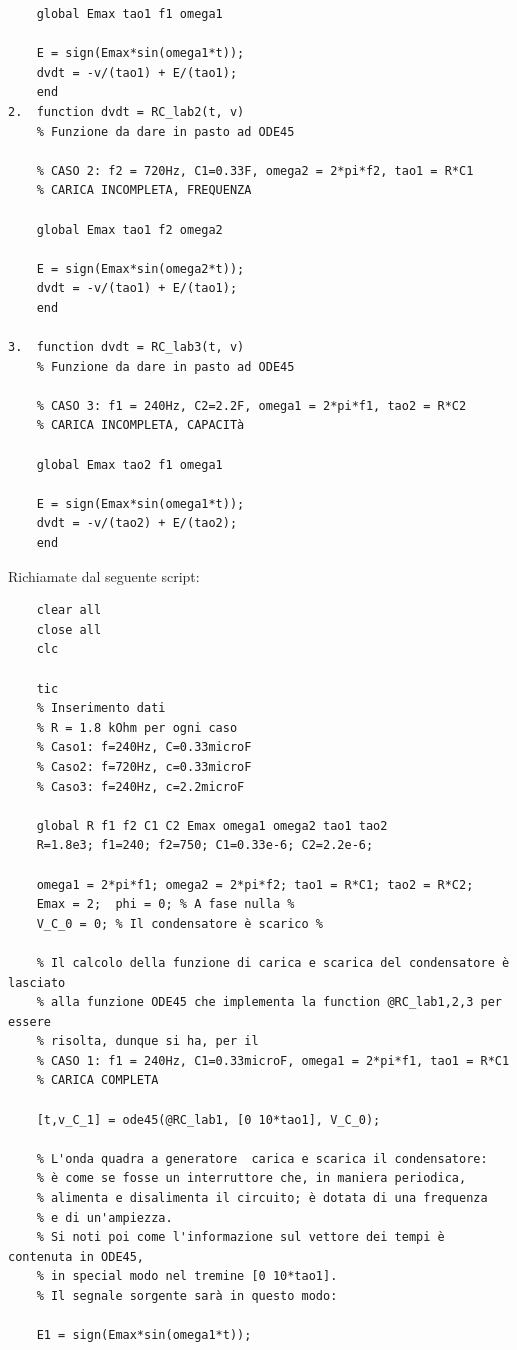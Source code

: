 \documentclass[a4paper, 12pt, twoside]{report}
\begin{document}
{\begin{verbatim}
    global Emax tao1 f1 omega1

    E = sign(Emax*sin(omega1*t));
    dvdt = -v/(tao1) + E/(tao1);
    end
2.  function dvdt = RC_lab2(t, v)
    % Funzione da dare in pasto ad ODE45

    % CASO 2: f2 = 720Hz, C1=0.33F, omega2 = 2*pi*f2, tao1 = R*C1
    % CARICA INCOMPLETA, FREQUENZA

    global Emax tao1 f2 omega2
 
    E = sign(Emax*sin(omega2*t));
    dvdt = -v/(tao1) + E/(tao1);
    end

3. 	function dvdt = RC_lab3(t, v)
    % Funzione da dare in pasto ad ODE45

    % CASO 3: f1 = 240Hz, C2=2.2F, omega1 = 2*pi*f1, tao2 = R*C2
    % CARICA INCOMPLETA, CAPACITà

    global Emax tao2 f1 omega1

    E = sign(Emax*sin(omega1*t));
    dvdt = -v/(tao2) + E/(tao2);
    end	
\end{verbatim}
Richiamate dal seguente script:
\begin{verbatim}
	clear all
	close all
	clc
	
	tic
	% Inserimento dati
	% R = 1.8 kOhm per ogni caso
	% Caso1: f=240Hz, C=0.33microF
	% Caso2: f=720Hz, c=0.33microF
	% Caso3: f=240Hz, c=2.2microF
	
	global R f1 f2 C1 C2 Emax omega1 omega2 tao1 tao2 
	R=1.8e3; f1=240; f2=750; C1=0.33e-6; C2=2.2e-6;
	
	omega1 = 2*pi*f1; omega2 = 2*pi*f2; tao1 = R*C1; tao2 = R*C2;
	Emax = 2;  phi = 0; % A fase nulla %
	V_C_0 = 0; % Il condensatore è scarico %
	
	% Il calcolo della funzione di carica e scarica del condensatore è lasciato
	% alla funzione ODE45 che implementa la function @RC_lab1,2,3 per essere
	% risolta, dunque si ha, per il 
	% CASO 1: f1 = 240Hz, C1=0.33microF, omega1 = 2*pi*f1, tao1 = R*C1
	% CARICA COMPLETA
	
	[t,v_C_1] = ode45(@RC_lab1, [0 10*tao1], V_C_0);
	
	% L'onda quadra a generatore  carica e scarica il condensatore: 
	% è come se fosse un interruttore che, in maniera periodica, 
	% alimenta e disalimenta il circuito; è dotata di una frequenza 
	% e di un'ampiezza.
	% Si noti poi come l'informazione sul vettore dei tempi è contenuta in ODE45, 
	% in special modo nel tremine [0 10*tao1]. 
	% Il segnale sorgente sarà in questo modo:
	
	E1 = sign(Emax*sin(omega1*t));  
	

\end{verbatim}}
\end{document}
